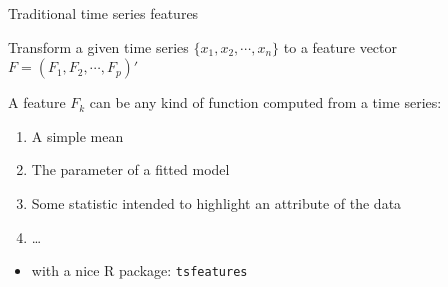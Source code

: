 \documentclass[10pt,aspectratio=43]{beamer}
\begin{document}





\begin{frame}{Traditional time series features}

  Transform a given time series \(\{x_1, x_2, \cdots, x_n\}\) to a feature
  vector \(F = (F_1, F_2, \cdots, F_p)'\) \citep{cikm2015,kang2017visualising}

  \begin{block}{A feature \(F_k\) can be any kind of function computed
      from a time series:}

    \begin{enumerate}
    \item
      A simple mean
    \item
      The parameter of a fitted model
    \item
      Some statistic intended to highlight an attribute of the data
    \item
      \ldots{}
    \end{enumerate}

  \end{block}

  \begin{itemize}
  \item with a nice R package: \texttt{tsfeatures} \citep{Hyndman2019}
  \end{itemize}

\end{frame}
\end{document}
